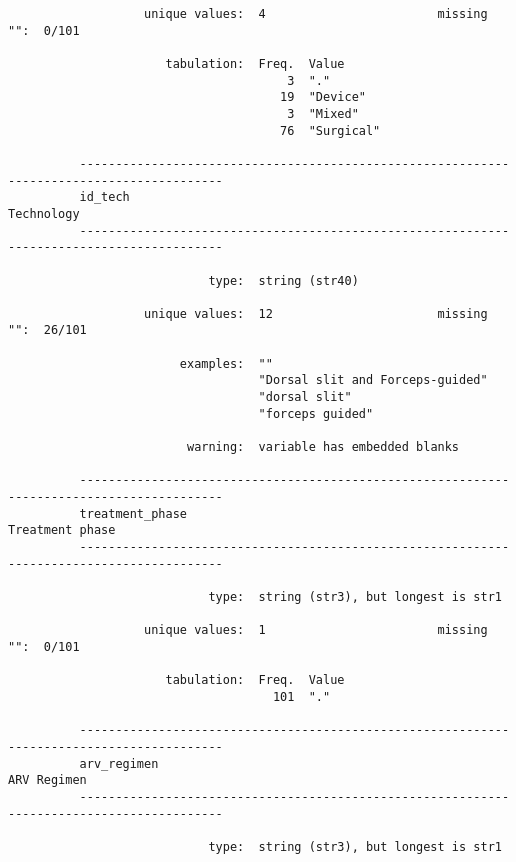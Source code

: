 \documentclass{article}
\begin{document}
\begin{verbatim}
                   unique values:  4                        missing "":  0/101
          
                      tabulation:  Freq.  Value
                                       3  "."
                                      19  "Device"
                                       3  "Mixed"
                                      76  "Surgical"
          
          ------------------------------------------------------------------------------------------
          id_tech                                                                         Technology
          ------------------------------------------------------------------------------------------
          
                            type:  string (str40)
          
                   unique values:  12                       missing "":  26/101
          
                        examples:  ""
                                   "Dorsal slit and Forceps-guided"
                                   "dorsal slit"
                                   "forceps guided"
          
                         warning:  variable has embedded blanks
          
          ------------------------------------------------------------------------------------------
          treatment_phase                                                            Treatment phase
          ------------------------------------------------------------------------------------------
          
                            type:  string (str3), but longest is str1
          
                   unique values:  1                        missing "":  0/101
          
                      tabulation:  Freq.  Value
                                     101  "."
          
          ------------------------------------------------------------------------------------------
          arv_regimen                                                                    ARV Regimen
          ------------------------------------------------------------------------------------------
          
                            type:  string (str3), but longest is str1
          

\end{verbatim}
\end{document}
